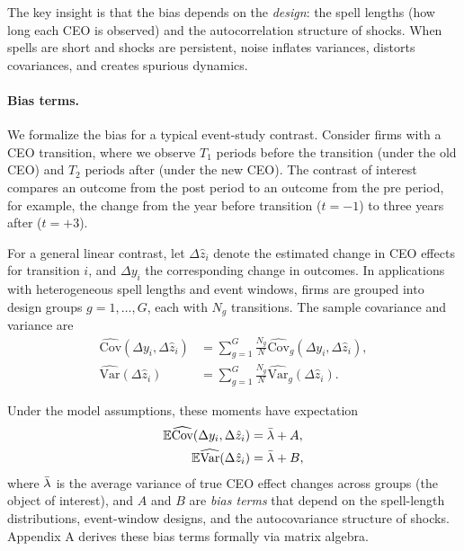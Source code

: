 \documentclass[11pt,a4paper]{article}
\newcommand{\Var}{\text{Var}}
\newcommand{\Cov}{\text{Cov}}
\begin{document}
The key insight is that the bias depends on the \emph{design}: the spell lengths (how long each CEO is observed) and the autocorrelation structure of shocks. When spells are short and shocks are persistent, noise inflates variances, distorts covariances, and creates spurious dynamics.

\paragraph{Bias terms.} We formalize the bias for a typical event-study contrast. Consider firms with a CEO transition, where we observe $T_1$ periods before the transition (under the old CEO) and $T_2$ periods after (under the new CEO). The contrast of interest compares an outcome from the post period to an outcome from the pre period, for example, the change from the year before transition ($t=-1$) to three years after ($t=+3$). 

For a general linear contrast, let $\Delta \hat z_i$ denote the estimated change in CEO effects for transition $i$, and $\Delta y_i$ the corresponding change in outcomes. In applications with heterogeneous spell lengths and event windows, firms are grouped into design groups $g=1,\ldots,G$, each with $N_g$ transitions. The sample covariance and variance are
\begin{align}
\widehat{\Cov}(\Delta y_i,\Delta \hat z_i) &= \sum_{g=1}^G \frac{N_g}{N} \widehat{\Cov}_g(\Delta y_i,\Delta \hat z_i),\\
\widehat{\Var}(\Delta \hat z_i) &= \sum_{g=1}^G \frac{N_g}{N} \widehat{\Var}_g(\Delta \hat z_i).
\end{align}

Under the model assumptions, these moments have expectation
\begin{align}
\mathbb E\widehat{\Cov}(\Delta y_i,\Delta \hat z_i) &= \Bar\lambda + A,\\
\mathbb E\widehat{\Var}(\Delta \hat z_i) &= \Bar\lambda + B,
\end{align}
where $\Bar\lambda$ is the average variance of true CEO effect changes across groups (the object of interest), and $A$ and $B$ are \emph{bias terms} that depend on the spell-length distributions, event-window designs, and the autocovariance structure of shocks. Appendix A derives these bias terms formally via matrix algebra.
\end{document}
